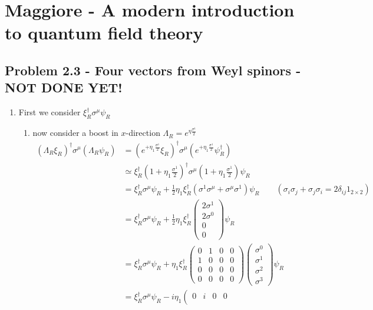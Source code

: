 \documentclass[../main.tex]{subfiles}
\begin{document}
\section{{\sc Maggiore} - A modern introduction to quantum field theory} 
\subsection{Problem 2.3 - Four vectors from Weyl spinors - NOT DONE YET!}
\begin{enumerate}
\item First we consider $\xi_R^\dagger\sigma^\mu\psi_R$
\begin{enumerate}
\item now consider a boost in $x$-direction $\Lambda_R=e^{\eta\frac{\sigma^1}{2}}$
\begin{align}
(\Lambda_R\xi_R)^\dagger\sigma^\mu(\Lambda_R\psi_R)
&=(e^{+\eta_1\frac{\sigma^1}{2}}\xi_R)^\dagger\sigma^\mu
(e^{+\eta_1\frac{\sigma^1}{2}}\psi_R^\dagger)\\
&\simeq\xi_R^\dagger\left(1+\eta_1\frac{\sigma^1}{2}\right)^\dagger\sigma^\mu\left(1+\eta_1\frac{\sigma^1}{2}\right)\psi_R\\
&=\xi_R^\dagger\sigma^\mu\psi_R+\frac{1}{2}\eta_1\xi^\dagger_R(\sigma^1\sigma^\mu+\sigma^\mu\sigma^1)\psi_R\qquad(\sigma_i\sigma_j+\sigma_j\sigma_i=2\delta_{ij}1_{2\times2})\\
&=\xi_R^\dagger\sigma^\mu\psi_R+\frac{1}{2}\eta_1\xi^\dagger_R
\left(\begin{matrix}
2\sigma^1\\
2\sigma^0\\
0\\
0
\end{matrix}\right)\psi_R\\
&=\xi_R^\dagger\sigma^\mu\psi_R+\eta_1\xi^\dagger_R
\left(\begin{matrix}
0&1&0&0\\
1&0&0&0\\
0&0&0&0\\
0&0&0&0
\end{matrix}\right)
\left(\begin{matrix}
\sigma^0\\
\sigma^1\\
\sigma^2\\
\sigma^3
\end{matrix}\right)\psi_R\\
&=\xi_R^\dagger\sigma^\mu\psi_R-i\eta_1\left(\begin{matrix}
0&i&0&0\\

\end{matrix}
\end{align}
\end{enumerate}
\end{enumerate}
\end{document}
